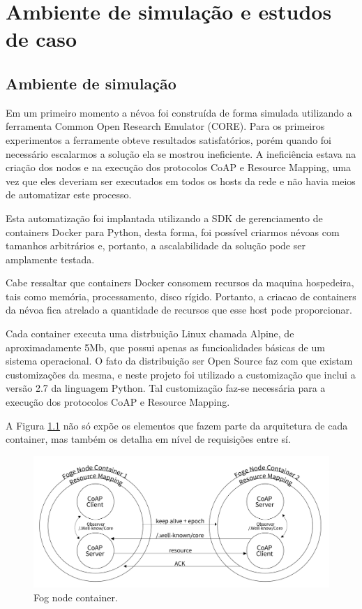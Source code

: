 \chapter{\label{chap:chap4} Ambiente de simulação e estudos de caso}

\section{Ambiente de simulação}
Em um primeiro momento a névoa foi construída de forma simulada utilizando a ferramenta Common Open Research Emulator (CORE)\cite{coregui}.
Para os primeiros experimentos a ferramente obteve resultados satisfatórios, porém quando foi necessário escalarmos a solução ela se mostrou ineficiente.
A ineficiência estava na criação dos nodos e na execução dos protocolos CoAP e Resource Mapping, uma vez que eles deveriam ser executados em todos os hosts da rede e não havia 
meios de automatizar este processo.

Esta automatização foi implantada utilizando a SDK de gerenciamento de containers Docker para Python, desta forma, foi possível criarmos névoas com tamanhos arbitrários
e, portanto, a ascalabilidade da solução pode ser amplamente testada\cite{dockersdk:2018}.

Cabe ressaltar que containers Docker\cite{docker:2018} consomem recursos da maquina hospedeira, tais como memória, processamento, disco rígido.
Portanto, a criacao de containers da névoa fica atrelado a quantidade de recursos que esse host pode proporcionar.

Cada container executa uma distrbuição Linux chamada Alpine, de aproximadamente 5Mb, que possui apenas as funcioalidades básicas de um sistema operacional\cite{linuxalpine:2018}.
O fato da distribuição ser Open Source faz com que existam customizações da mesma, e neste projeto foi utilizado a customização que inclui a versão 2.7 da linguagem Python.
Tal customização faz-se necessária para a execução dos protocolos CoAP e Resource Mapping.


A Figura \ref{fig:fig13} não só expõe os elementos que fazem parte da arquitetura de cada container, mas também os detalha em nível de requisições entre sí.


\begin{figure}[H]
    \centering\includegraphics[width=.8\textwidth]{fig13.png}
    \caption%
    {\label{fig:fig13} Fog node container.}
\end{figure}


